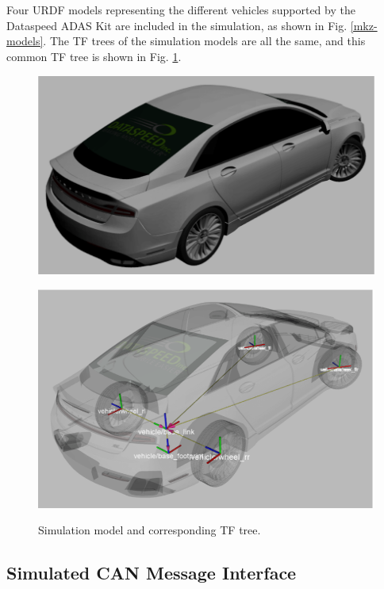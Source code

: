 Four URDF models representing the different vehicles supported by the Dataspeed ADAS Kit are included in the simulation, as shown in Fig. \ref{mkz-models}. The TF trees of the simulation models are all the same, and this common TF tree is shown in Fig. \ref{fig:dataspeed}.

\begin{figure}
\centering
\begin{minipage}{.5\textwidth}
  \centering
  \includegraphics[width=0.9\linewidth]{figs/ch2/mkz-model}
  \label{fig:sub1}
\end{minipage}%
\begin{minipage}{.5\textwidth}
  \centering
  \includegraphics[width=0.82\linewidth]{figs/ch2/mkz-tf-tree}
  \label{fig:sub2}
\end{minipage}
\caption{Simulation model and corresponding TF tree.}
\label{fig:dataspeed}
\end{figure}

\subsection{Simulated CAN Message Interface}

